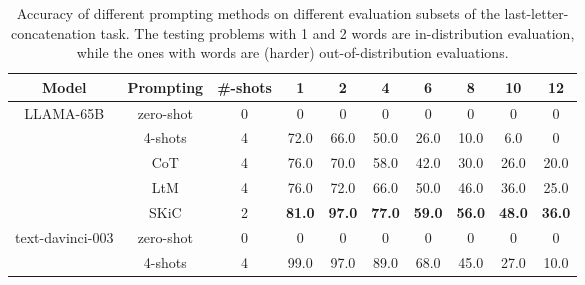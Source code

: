 \documentclass{article} \usepackage{arxiv}
\begin{document}
\begin{table}[th]
 \caption{Accuracy of different prompting methods on different evaluation subsets of the last-letter-concatenation task. The testing problems with 1 and 2 words are in-distribution evaluation, while the ones with  words are (harder) out-of-distribution evaluations. } \label{Tab:last_letter_results}
\centering
\small
\begin{tabular}{c|c|c|cc|ccccc} \toprule
\textbf{Model}                & \textbf{Prompting} &\textbf{\#-shots}     & \multicolumn{1}{c}{\textbf{1}} & \multicolumn{1}{c|}{\textbf{2}} & \multicolumn{1}{c}{\textbf{4}} & \multicolumn{1}{c}{\textbf{6}} & \multicolumn{1}{c}{\textbf{8}} & \multicolumn{1}{c}{\textbf{10}} & \multicolumn{1}{c}{\textbf{12}} \\ \midrule \midrule
\multirow{5}{*}{LLAMA-65B} & zero-shot  &0        & 0                     & 0                     & 0                     & 0                     & 0                     & 0                      & 0                      \\
                           & 4-shots   &4      & 72.0                    & 66.0                    & 50.0                    & 26.0                    & 10.0                   & 6.0                      & 0                      \\
                           & CoT   &4        & 76.0                    & 70.0                    & 58.0                    & 42.0                    & 30.0                    & 26.0                     & 20.0                     \\
                           & LtM &4  & 76.0                    & 72.0                    & 66.0                   & 50.0                   & 46.0                    & 36.0                     & 25.0                     \\
                           & SKiC  &2 & \textbf{81.0}           & \textbf{97.0}           & \textbf{77.0}           & \textbf{59.0}           & \textbf{56.0}           & \textbf{48.0}            & \textbf{36.0}            \\  \midrule
\multirow{5}{*}{text-davinci-003}  & zero-shot   &0        & 0                     & 0                     & 0                     & 0                     & 0                     & 0                      & 0                      \\
                           & 4-shots  &4     & 99.0                    & 97.0                    & 89.0                    & 68.0                    & 45.0                    & 27.0                     & 10.0                     \\

\end{tabular}
\end{table}
\end{document}
